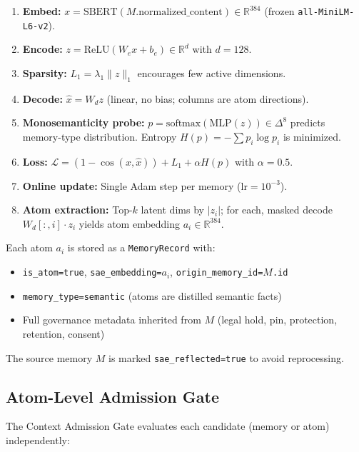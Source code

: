 \documentclass[11pt]{article}
\newcommand{\R}{\mathbb{R}}
\begin{document}
\begin{enumerate}
  \item \textbf{Embed:} $x = \text{SBERT}(M.\text{normalized\_content}) \in \R^{384}$ (frozen \texttt{all-MiniLM-L6-v2}).
  \item \textbf{Encode:} $z = \text{ReLU}(W_e x + b_e) \in \R^{d}$ with $d=128$.
  \item \textbf{Sparsity:} $L_1 = \lambda_1 \|z\|_1$ encourages few active dimensions.
  \item \textbf{Decode:} $\hat{x} = W_d z$ (linear, no bias; columns are atom directions).
  \item \textbf{Monosemanticity probe:} $p = \text{softmax}(\text{MLP}(z)) \in \Delta^{8}$ predicts memory-type distribution. Entropy $H(p) = -\sum p_i \log p_i$ is minimized.
  \item \textbf{Loss:} $\mathcal{L} = (1-\cos(x,\hat{x})) + L_1 + \alpha H(p)$ with $\alpha=0.5$.
  \item \textbf{Online update:} Single Adam step per memory ($\text{lr}=10^{-3}$).
  \item \textbf{Atom extraction:} Top-$k$ latent dims by $|z_i|$; for each, masked decode $W_d[:,i] \cdot z_i$ yields atom embedding $a_i \in \R^{384}$.
\end{enumerate}

Each atom $a_i$ is stored as a \texttt{MemoryRecord} with:
\begin{itemize}
  \item \texttt{is\_atom=true}, \texttt{sae\_embedding=$a_i$}, \texttt{origin\_memory\_id=$M$.id}
  \item \texttt{memory\_type=semantic} (atoms are distilled semantic facts)
  \item Full governance metadata inherited from $M$ (legal hold, pin, protection, retention, consent)
\end{itemize}

The source memory $M$ is marked \texttt{sae\_reflected=true} to avoid reprocessing.

\subsection{Atom-Level Admission Gate}
\label{sec:admission}

The Context Admission Gate evaluates each candidate (memory or atom) independently:
\end{document}
